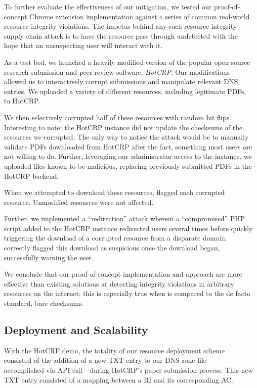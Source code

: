 To further evaluate the effectiveness of our mitigation, we tested our
proof-of-concept \SYSTEM{} Chrome extension implementation against a series of
common real-world resource integrity violations. The impetus behind any such
resource integrity supply chain attack is to have the resource pass through
undetected with the hope that an unsuspecting user will interact with it.

As a test bed, we launched a heavily modified version of the popular open source
research submission and peer review software, \emph{HotCRP}. Our modifications
allowed us to interactively corrupt submissions and manipulate relevant DNS
entries. We uploaded a variety of different resources, including legitimate
PDFs, to HotCRP.

We then selectively corrupted half of these resources with random bit flips.
Interesting to note: the HotCRP instance did not update the checksums of the
resources we corrupted. The only way to notice the attack would be to manually
validate PDFs downloaded from HotCRP after the fact, something most users are
not willing to do. Further, leveraging our administrator access to the instance,
we uploaded files known to be malicious, replacing previously submitted PDFs in
the HotCRP backend.

When we attempted to download these resources, \SYSTEM{} flagged each corrupted
resource. Unmodified resources were not affected.

Further, we implemented a ``redirection'' attack wherein a ``compromised'' PHP
script added to the HotCRP instance redirected users several times before
quickly triggering the download of a corrupted resource from a disparate domain.
\SYSTEM{} correctly flagged this download as suspicious once the download began,
successfully warning the user.

We conclude that our proof-of-concept \SYSTEM{} implementation and approach are
more effective than existing solutions at detecting integrity violations in
arbitrary resources on the internet; this is especially true when \SYSTEM{} is
compared to the de facto standard, bare checksums.

\subsection{Deployment and Scalability}

With the HotCRP demo, the totality of our resource deployment scheme consisted
of the addition of a new TXT entry to our DNS zone file---accomplished via API
call---during HotCRP's paper submission process. This new TXT entry consisted of
a mapping between a RI and its corresponding AC.

